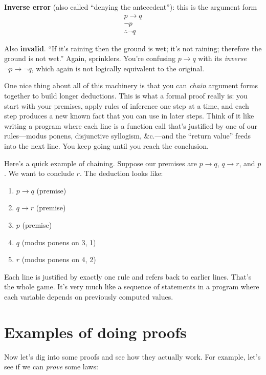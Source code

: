 \documentclass[11pt]{article}
\begin{document}
\textbf{Inverse error} (also called ``denying the antecedent''): this is the argument form
\[
  \begin{array}{c}
    p \to q \\
    \lnot p \\
    \hline
    \therefore \lnot q
  \end{array}
\]

Also \textbf{invalid}. ``If it's raining then the ground is wet; it's not raining; therefore the ground is not wet.'' Again, sprinklers. You're confusing $p \to q$ with its \emph{inverse} $\lnot p \to \lnot q$, which again is not logically equivalent to the original.

One nice thing about all of this machinery is that you can \emph{chain} argument forms together to build longer deductions. This is what a formal proof really is: you start with your premises, apply rules of inference one step at a time, and each step produces a new known fact that you can use in later steps. Think of it like writing a program where each line is a function call that's justified by one of our rules---modus ponens, disjunctive syllogism, \&c.---and the ``return value'' feeds into the next line. You keep going until you reach the conclusion.

Here's a quick example of chaining. Suppose our premises are $p \to q$, $q \to r$, and $p$. We want to conclude $r$. The deduction looks like:

\begin{enumerate}
  \item $p \to q$ \hfill (premise)
  \item $q \to r$ \hfill (premise)
  \item $p$ \hfill (premise)
  \item $q$ \hfill (modus ponens on 3, 1)
  \item $r$ \hfill (modus ponens on 4, 2)
\end{enumerate}

Each line is justified by exactly one rule and refers back to earlier lines. That's the whole game. It's very much like a sequence of statements in a program where each variable depends on previously computed values.

\section{Examples of doing proofs}

Now let's dig into some proofs and see how they actually work. For example, let's see if we can \emph{prove} some laws:
\end{document}
